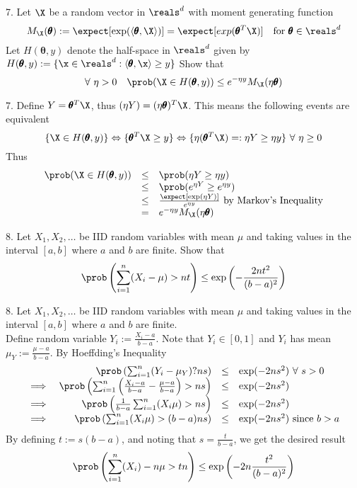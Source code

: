 \documentclass[11pt,a4paper]{article}
\begin{document}
\begin{question}{7.}
  Let $\X$ be a random vector in $\reals^d$ with moment generating function
  \[ M_\X(\pmb\theta):=\expect[\exp(\langle\pmb\theta,\X\rangle)]=\expect[exp(\pmb\theta^T\X)]\quad\text{for }\pmb\theta\in\reals^d \]
  Let $H(\pmb\theta,y)$ denote the half-space in $\reals^d$ given by $H(\pmb\theta,y):=\{\x\in\reals^d:\langle\pmb\theta,\x\rangle\geq y\}$
  Show that
  \[ \forall\ \eta>0\quad\prob(\X\in H(\pmb\theta,y))\leq e^{-\eta y}M_\X(\eta\pmb\theta) \]
\end{question}

\begin{answer}{7.}
  Define $Y=\pmb\theta^T\X$, thus $(\eta Y)=(\eta\pmb\theta)^T\X$. This means the following events are equivalent
  \[ \{\X\in H(\pmb\theta,y)\}\Leftrightarrow\{\pmb\theta^T\X\geq y\}\Leftrightarrow \{\eta(\pmb\theta^T\X)=:\eta Y\geq\eta y\}\ \forall\ \eta\geq0 \]
  Thus
  \[\begin{array}{rcl}
    \prob(\X\in H(\pmb\theta,y))&\leq&\prob(\eta Y\geq\eta y)\\
    &\leq&\prob(e^{\eta Y}\geq e^{\eta y})\\
    &\leq&\frac{\expect[\exp(\eta Y)]}{e^{\eta y}}\text{ by Markov's Inequality}\\
    &=&e^{-\eta y}M_\X(\eta\pmb\theta)
  \end{array}\]
\end{answer}

\begin{question}{8.}
  Let $X_1,X_2,\dots$ be IID random variables with mean $\mu$ and taking values in the interval $[a,b]$ where $a$ and $b$ are finite. Show that
  \[ \prob\left(\sum_{i=1}^n(X_i-\mu)>nt\right)\leq\exp\left(-\frac{2nt^2}{(b-a)^2}\right) \]
\end{question}

\begin{answer}{8.}
  Let $X_1,X_2,\dots$ be IID random variables with mean $\mu$ and taking values in the interval $[a,b]$ where $a$ and $b$ are finite.\\
  Define random variable $Y_i:=\frac{X_i-a}{b-a}$. Note that $Y_i\in[0,1]$ and $Y_i$ has mean $\mu_Y:=\frac{\mu-a}{b-a}$. By Hoeffding's Inequality
  \[\begin{array}{rrcl}
    &\prob\left(\sum_{i=1}^n(Y_i-\mu_Y)?ns\right)&\leq&\exp(-2ns^2)\ \forall\ s>0\\
    \implies&\prob\left(\sum_{i=1}^n\left(\frac{X_i-a}{b-a}-\frac{\mu-a}{b-a}\right)>ns\right)&\leq&\exp(-2ns^2)\\
    \implies&\prob\left(\frac1{b-a}\sum_{i=1}^n(X_i\mu)>ns\right)&\leq&\exp(-2ns^2)\\
    \implies&\prob\left(\sum_{i=1}^n(X_i\mu)>(b-a)ns\right)&\leq&\exp(-2ns^2)\text{ since }b>a\\
  \end{array}\]
  By defining $t:=s(b-a)$, and noting that $s=\frac{t}{b-a}$, we get the desired result
  \[ \prob\left(\sum_{i=1}^n(X_i)-n\mu>tn\right)\leq\exp\left(-2n\frac{t^2}{(b-a)^2}\right) \]
\end{answer}
\end{document}
